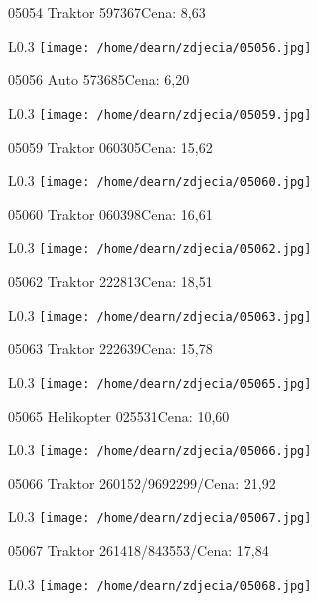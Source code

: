 05054 Traktor     597367Cena: 8,63\newline
\begin{wrapfigure}{L}{0.3\textwidth}
\texttt{[image: /home/dearn/zdjecia/05056.jpg]}
\end{wrapfigure}
05056 Auto     573685Cena: 6,20\newline
\begin{wrapfigure}{L}{0.3\textwidth}
\texttt{[image: /home/dearn/zdjecia/05059.jpg]}
\end{wrapfigure}
05059 Traktor 060305Cena: 15,62\newline
\begin{wrapfigure}{L}{0.3\textwidth}
\texttt{[image: /home/dearn/zdjecia/05060.jpg]}
\end{wrapfigure}
05060 Traktor    060398Cena: 16,61\newline
\begin{wrapfigure}{L}{0.3\textwidth}
\texttt{[image: /home/dearn/zdjecia/05062.jpg]}
\end{wrapfigure}
05062 Traktor    222813Cena: 18,51\newline
\begin{wrapfigure}{L}{0.3\textwidth}
\texttt{[image: /home/dearn/zdjecia/05063.jpg]}
\end{wrapfigure}
05063 Traktor    222639Cena: 15,78\newline
\begin{wrapfigure}{L}{0.3\textwidth}
\texttt{[image: /home/dearn/zdjecia/05065.jpg]}
\end{wrapfigure}
05065 Helikopter  025531Cena: 10,60\newline
\begin{wrapfigure}{L}{0.3\textwidth}
\texttt{[image: /home/dearn/zdjecia/05066.jpg]}
\end{wrapfigure}
05066 Traktor   260152/9692299/Cena: 21,92\newline
\begin{wrapfigure}{L}{0.3\textwidth}
\texttt{[image: /home/dearn/zdjecia/05067.jpg]}
\end{wrapfigure}
05067 Traktor   261418/843553/Cena: 17,84\newline
\begin{wrapfigure}{L}{0.3\textwidth}
\texttt{[image: /home/dearn/zdjecia/05068.jpg]}
\end{wrapfigure}
